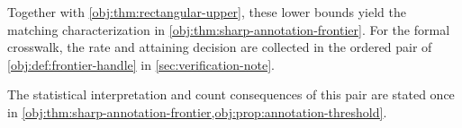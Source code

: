 Together with \cref{obj:thm:rectangular-upper}, these lower bounds yield the matching characterization in \cref{obj:thm:sharp-annotation-frontier}. For the formal crosswalk, the rate and attaining decision are collected in the ordered pair of \cref{obj:def:frontier-handle} in \cref{sec:verification-note}.



The statistical interpretation and count consequences of this pair are stated once in \cref{obj:thm:sharp-annotation-frontier,obj:prop:annotation-threshold}.
